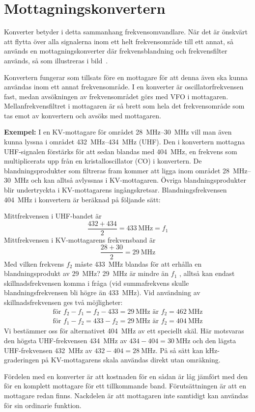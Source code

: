 \section{Mottagningskonvertern}


Konverter betyder i detta sammanhang frekvensomvandlare.
När det är önskvärt att flytta över alla signalerna inom ett helt frekvensområde
till ett annat, så används en mottagningskonverter där frekvensblandning och
frekvensfilter används, så som illustreras i bild~.

Konvertern fungerar som tillsats före en mottagare för att denna även
ska kunna användas inom ett annat frekvensområde.
I en konverter är oscillatorfrekvensen fast, medan avsökningen av
frekvensområdet görs med VFO i mottagaren.
Mellanfrekvensfiltret i mottagaren är så brett som hela det frekvensområde
som tas emot av konvertern och avsöks med mottagaren.

\textbf{Exempel:}
I en KV-mottagare för området \SIrange{28}{30}{\mega\hertz} vill man även kunna
lyssna i området \SIrange{432}{434}{\mega\hertz} (UHF).
Den i konvertern mottagna UHF-signalen förstärks för att sedan blandas med
\qty{404}{\mega\hertz}, en frekvens som multiplicerats upp från en
kristalloscillator (CO) i konvertern.
De blandningsprodukter som filtreras fram kommer att ligga inom området
\SIrange{28}{30}{\mega\hertz} och kan alltså avlyssnas i KV-mottagaren.
Övriga blandningsprodukter blir undertryckta i KV-mottagarens ingångskretsar.
Blandningsfrekvensen \qty{404}{\mega\hertz} i konvertern är beräknad på följande
sätt:

\noindent
Mittfrekvensen i UHF-bandet är
\[\frac{432+434}{2} = \qty{433}{\mega\hertz} = f_1\]
Mittfrekvensen i KV-mottagarens frekvensband är
\[\frac{28 + 30}{2} = \qty{29}{\mega\hertz}\]
Med vilken frekvens \(f_2\) måste \qty{433}{\mega\hertz} blandas för att erhålla
en blandningsprodukt av \qty{29}{\mega\hertz}?
\qty{29}{\mega\hertz} är mindre än \(f_1\) , alltså kan endast
skillnadsfrekvensen komma i fråga (vid summafrekvens skulle blandningsfrekvensen
bli högre än \qty{433}{\mega\hertz}).
Vid användning av skillnadsfrekvensen ges två möjligheter:
\begin{gather*}
  \text{för }f_2 - f_1 = f_2 - 433 = \qty{29}{\mega\hertz}\text{ är }f_2 = \qty{462}{\mega\hertz} \\
  \text{för }f_1 - f_2 = 433 - f_2 = \qty{29}{\mega\hertz}\text{ är }f_2 = \qty{404}{\mega\hertz}
\end{gather*}
Vi bestämmer oss för alternativet \qty{404}{\mega\hertz} av ett speciellt skäl.
Här motsvaras den högsta UHF-frekvensen \qty{434}{\mega\hertz} av \(434 - 404 =
\qty{30}{\mega\hertz}\) och den lägsta UHF-frekvensen \qty{432}{\mega\hertz} av
\(432 - 404 = \qty{28}{\mega\hertz}\).
På så sätt kan kHz-graderingen på KV-mottagarens skala användas direkt utan
omräkning.

Fördelen med en konverter är att kostnaden för en sådan är låg jämfört
med den för en komplett mottagare för ett tillkommande band.
Förutsättningen är att en mottagare redan finns.
Nackdelen är att mottagaren inte samtidigt kan användas för sin
ordinarie funktion.
